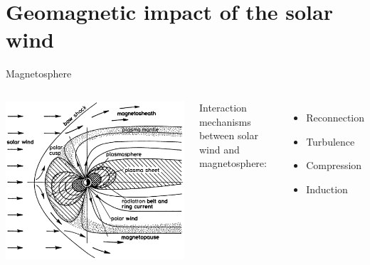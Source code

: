 \section{Geomagnetic impact of the solar wind}

\begin{frame}[plain,c]{Magnetosphere}{}
	\begin{columns}[c]
		
		\includegraphics[width=\textwidth]{../figures_of_others/images/Davies1990_magnetosphere_sharpened.png}

		
		Interaction mechanisms between solar wind and magnetosphere:
		\begin{itemize}
			\item Reconnection
			\item Turbulence
			\item Compression
			\item Induction
		\end{itemize}

	\end{columns}
\end{frame}
